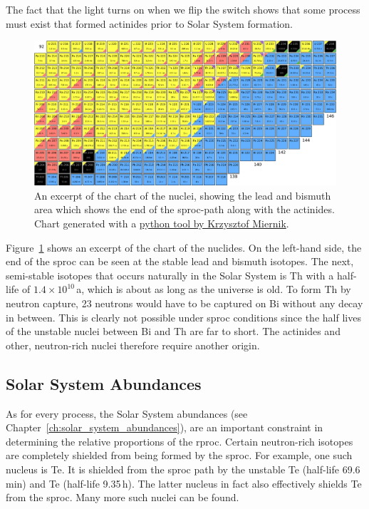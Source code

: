 The fact that the light turns on when we flip the switch shows that some process must exist that formed actinides prior to Solar System formation. 
\begin{figure}[tb]
    \centering
    \includegraphics[width=\textwidth]{graphics/r-process/actinides_chartnuc}
    \caption{An excerpt of the chart of the nuclei, showing the lead and bismuth area which shows the end of the \ac{sproc}-path along with the actinides. Chart generated with a \href{https://github.com/kmiernik/Chart-of-nuclides-drawer}{python tool by Krzysztof Miernik}.}
    \label{fig:r-process:actinides_chart_nuclides}
\end{figure}
Figure~\ref{fig:r-process:actinides_chart_nuclides} shows an excerpt of the chart of the nuclides. On the left-hand side, the end of the \ac{sproc} can be seen at the stable lead and bismuth isotopes. The next, semi-stable isotopes that occurs naturally in the Solar System is Th with a half-life of $1.4\times10^{10}$\,a, which is about as long as the universe is old. To form Th by neutron capture, 23 neutrons would have to be captured on Bi without any decay in between. This is clearly not possible under \ac{sproc} conditions since the half lives of the unstable nuclei between Bi and Th are far to short. The actinides and other, neutron-rich nuclei therefore require another origin. 

\subsection{Solar System Abundances}

As for every process, the Solar System abundances (see Chapter~\ref{ch:solar_system_abundances}), are an important constraint in determining the relative proportions of the \ac{rproc}. Certain neutron-rich isotopes are completely shielded from being formed by the \ac{sproc}. For example, one such nucleus is Te. It is shielded from the \ac{sproc} path by the unstable Te (half-life 69.6\,min) and Te (half-life 9.35\,h). The latter nucleus in fact also effectively shields Te from the \ac{sproc}. Many more such nuclei can be found. 


